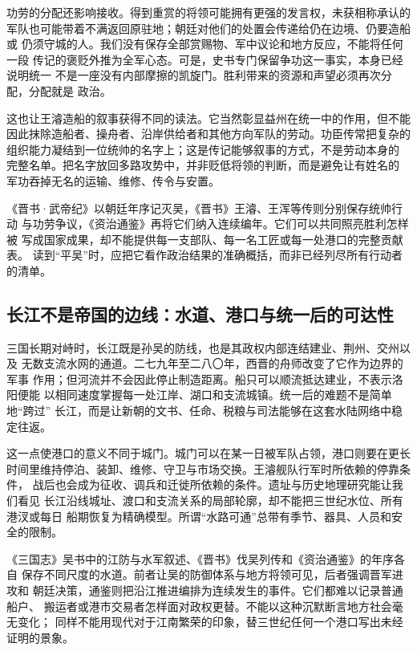 功劳的分配还影响接收。得到重赏的将领可能拥有更强的发言权，未获相称承认的
军队也可能带着不满返回原驻地；朝廷对他们的处置会传递给仍在边境、仍要造船或
仍须守城的人。我们没有保存全部赏赐物、军中议论和地方反应，不能将任何一段
传记的褒贬外推为全军心态。可是，史书专门保留争功这一事实，本身已经说明统一
不是一座没有内部摩擦的凯旋门。胜利带来的资源和声望必须再次分配，分配就是
政治。

这也让王濬造船的叙事获得不同的读法。它当然彰显益州在统一中的作用，但不能
因此抹除造船者、操舟者、沿岸供给者和其他方向军队的劳动。功臣传常把复杂的
组织能力凝结到一位统帅的名字上；这是传记能够叙事的方式，不是劳动本身的
完整名单。把名字放回多路攻势中，并非贬低将领的判断，而是避免让有姓名的
军功吞掉无名的运输、维修、传令与安置。

\begin{textwindow}[“平吴”的一句话为何容不下全部行动]
《晋书·武帝纪》以朝廷年序记灭吴，《晋书》王濬、王浑等传则分别保存统帅行动
与功劳争议，《资治通鉴》再将它们纳入连续编年。它们可以共同照亮胜利怎样被
写成国家成果，却不能提供每一支部队、每一名工匠或每一处港口的完整贡献表。
读到“平吴”时，应把它看作政治结果的准确概括，而非已经列尽所有行动者的清单。
\end{textwindow}

\subsection{长江不是帝国的边线：水道、港口与统一后的可达性}

三国长期对峙时，长江既是孙吴的防线，也是其政权内部连结建业、荆州、交州以及
无数支流水网的通道。二七九年至二八〇年，西晋的舟师改变了它作为边界的军事
作用；但河流并不会因此停止制造距离。船只可以顺流抵达建业，不表示洛阳便能
以相同速度掌握每一处江岸、湖口和支流城镇。统一后的难题不是简单地“跨过”
长江，而是让新朝的文书、任命、税粮与司法能够在这套水陆网络中稳定往返。

这一点使港口的意义不同于城门。城门可以在某一日被军队占领，港口则要在更长
时间里维持停泊、装卸、维修、守卫与市场交换。王濬舰队行军时所依赖的停靠条件，
战后也会成为征收、调兵和迁徙所依赖的条件。遗址与历史地理研究能让我们看见
长江沿线城址、渡口和支流关系的局部轮廓，却不能把三世纪水位、所有港汊或每日
船期恢复为精确模型。所谓“水路可通”总带有季节、器具、人员和安全的限制。

《三国志》吴书中的江防与水军叙述、《晋书》伐吴列传和《资治通鉴》的年序各自
保存不同尺度的水道。前者让吴的防御体系与地方将领可见，后者强调晋军进攻和
朝廷决策，通鉴则把沿江推进编排为连续发生的事件。它们都难以记录普通船户、
搬运者或港市交易者怎样面对政权更替。不能以这种沉默断言地方社会毫无变化；
同样不能用现代对于江南繁荣的印象，替三世纪任何一个港口写出未经证明的景象。

